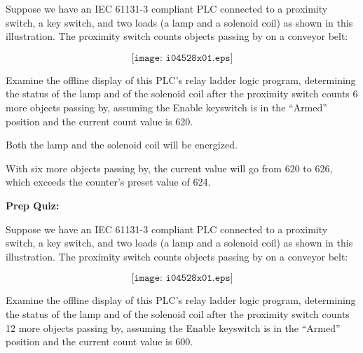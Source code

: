

Suppose we have an IEC 61131-3 compliant PLC connected to a proximity switch, a key switch, and two loads (a lamp and a solenoid coil) as shown in this illustration.  The proximity switch counts objects passing by on a conveyor belt:

$$\texttt{[image: i04528x01.eps]}$$

Examine the offline display of this PLC's relay ladder logic program, determining the status of the lamp and of the solenoid coil after the proximity switch counts 6 more objects passing by, assuming the Enable keyswitch is in the ``Armed'' position and the current count value is 620.







Both the lamp and the solenoid coil will be energized.







With six more objects passing by, the current value will go from 620 to 626, which exceeds the counter's preset value of 624.

\vfil \eject

\noindent
{\bf Prep Quiz:}

Suppose we have an IEC 61131-3 compliant PLC connected to a proximity switch, a key switch, and two loads (a lamp and a solenoid coil) as shown in this illustration.  The proximity switch counts objects passing by on a conveyor belt:

$$\texttt{[image: i04528x01.eps]}$$

Examine the offline display of this PLC's relay ladder logic program, determining the status of the lamp and of the solenoid coil after the proximity switch counts 12 more objects passing by, assuming the Enable keyswitch is in the ``Armed'' position and the current count value is 600.




